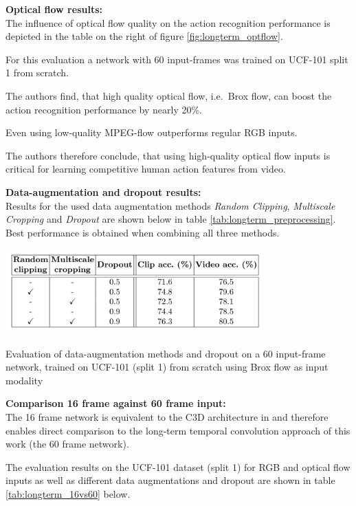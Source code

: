 \textbf{Optical flow results:} \\
The influence of optical flow quality on the action recognition performance is depicted in the table on the right of figure \ref{fig:longterm_optflow}.

For this evaluation a network with 60 input-frames was trained on UCF-101 split 1 from scratch.

The authors find, that high quality optical flow, i.e.\ Brox flow, can boost the action recognition performance by nearly 20\%.

Even using low-quality MPEG-flow outperforms regular RGB inputs.

The authors therefore conclude, that using high-quality optical flow inputs is critical for learning competitive human action features from video.

\textbf{Data-augmentation and dropout results:} \\
Results for the used data augmentation methods \textit{Random Clipping}, \textit{Multiscale Cropping} and \textit{Dropout} are shown below in table \ref{tab:longterm_preprocessing}.
Best performance is obtained when combining all three methods.

\begin{table}[H]
    \centering
    \includegraphics[width=0.75\textwidth]{img_deep/longterm_preprocessing}
    \caption{Evaluation of data-augmentation methods and dropout on a 60 input-frame network, trained on UCF-101 (split 1) from scratch using Brox flow as input modality \cite{varol_long-term_2016}}
    \label{tab:longterm_preprocessing}
\end{table}

\textbf{Comparison 16 frame against 60 frame input:}\\
The 16 frame network is equivalent to the C3D architecture in \cite{tran_learning_2015} and therefore enables direct comparison to the long-term temporal convolution approach of this work (the 60 frame network).

The evaluation results on the UCF-101 dataset (split 1) for RGB and optical flow inputs as well as different data augmentations and dropout are shown in table \ref{tab:longterm_16vs60} below.

